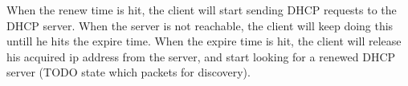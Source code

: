 When the renew time is hit, the client will start sending DHCP requests to the DHCP server. When the server is not reachable, the client will keep doing this untill he hits the expire time. When the expire time is hit, the client will release his acquired ip address from the server, and start looking for a renewed DHCP server (TODO state which packets for discovery).
